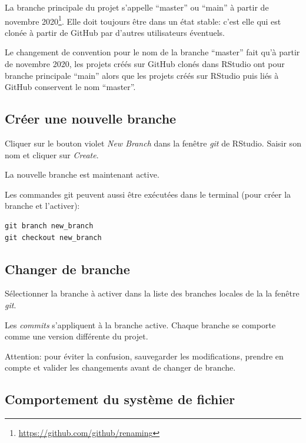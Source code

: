 \documentclass[
  11pt,
  french,
  a4paper,
  extrafontsizes,onecolumn,openright
  ]{memoir}
\begin{document}
La branche principale du projet s'appelle ``master'' ou ``main'' à partir de novembre 2020\footnote{\url{https://github.com/github/renaming}}.
Elle doit toujours être dans un état stable: c'est elle qui est clonée à partir de GitHub par d'autres utilisateurs éventuels.

Le changement de convention pour le nom de la branche ``master'' fait qu'à partir de novembre 2020, les projets créés sur GitHub clonés dans RStudio ont pour branche principale ``main'' alors que les projets créés sur RStudio puis liés à GitHub conservent le nom ``master''.

\hypertarget{cruxe9er-une-nouvelle-branche}{%
\subsection{Créer une nouvelle branche}\label{cruxe9er-une-nouvelle-branche}}

Cliquer sur le bouton violet \emph{New Branch} dans la fenêtre \emph{git} de RStudio.
Saisir son nom et cliquer sur \emph{Create}.

La nouvelle branche est maintenant active.

Les commandes git peuvent aussi être exécutées dans le terminal (pour créer la branche et l'activer):

\begin{verbatim}
git branch new_branch
git checkout new_branch
\end{verbatim}

\hypertarget{changer-de-branche}{%
\subsection{Changer de branche}\label{changer-de-branche}}

Sélectionner la branche à activer dans la liste des branches locales de la la fenêtre \emph{git}.

Les \emph{commits} s'appliquent à la branche active.
Chaque branche se comporte comme une version différente du projet.

Attention: pour éviter la confusion, sauvegarder les modifications, prendre en compte et valider les changements avant de changer de branche.

\hypertarget{comportement-du-systuxe8me-de-fichier}{%
\subsection{Comportement du système de fichier}\label{comportement-du-systuxe8me-de-fichier}}
\end{document}
